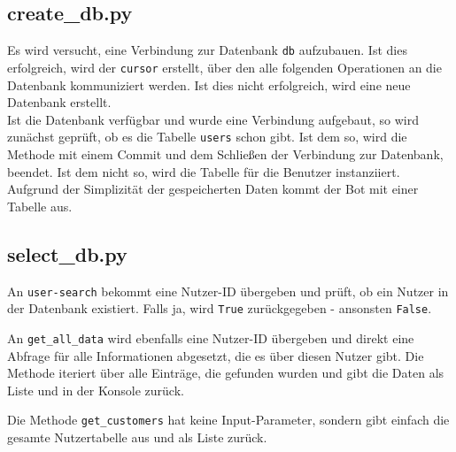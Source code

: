         \subsection{create\_db.py}
            Es wird versucht, eine Verbindung zur Datenbank \verb|db| aufzubauen. Ist dies erfolgreich, wird der \verb|cursor| erstellt, über den alle folgenden Operationen an die Datenbank kommuniziert werden. Ist dies nicht erfolgreich, wird eine neue Datenbank erstellt.\\
            Ist die Datenbank verfügbar und wurde eine Verbindung aufgebaut, so wird zunächst geprüft, ob es die Tabelle \verb|users| schon gibt. Ist dem so, wird die Methode mit einem Commit und dem Schließen der Verbindung zur Datenbank, beendet. Ist dem nicht so, wird die Tabelle für die Benutzer instanziiert. Aufgrund der Simplizität der gespeicherten Daten kommt der Bot mit einer Tabelle aus.


        \subsection{select\_db.py} \label{Implementierung: select_db.py}

            An \verb|user-search| bekommt eine Nutzer-ID übergeben und prüft, ob ein Nutzer in der Datenbank existiert. Falls ja, wird \verb|True| zurückgegeben - ansonsten \verb|False|.

                An \verb|get_all_data| wird ebenfalls eine Nutzer-ID übergeben und direkt eine Abfrage für alle Informationen abgesetzt, die es über diesen Nutzer gibt. Die Methode iteriert über alle Einträge, die gefunden wurden und gibt die Daten als Liste und in der Konsole zurück.
                
                Die Methode \verb|get_customers| hat keine Input-Parameter, sondern gibt einfach die gesamte Nutzertabelle aus und als Liste zurück.

